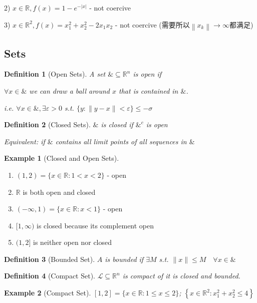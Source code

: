 \documentclass[11pt,a4paper]{article}
\newtheorem{definition}{Definition}
\newtheorem{example}{Example}
\begin{document}
2) $x \in \mathbb{R}, f(x)=1-e^{-|x|}$ - not coercive

3) $x \in \mathbb{R}^{2}, f(x)=x_{1}^{2}+x_{2}^{2}-2 x_{1} x_{2}$ - not coercive
(需要所以$\left\|x_{k}\right\| \rightarrow \infty$都满足)


\subsection{Sets}
\begin{definition}[Open Sets]
    A set $\& \subseteq \mathbb{R}^{n}$ is open if
    
    $\forall x \in \&$ we can draw a ball around $x$ that is contained in $\&$.

    i.e. $\forall x \in \&, \exists \varepsilon>0$ s.t. $\{y:\|y-x\|<\varepsilon\} \leq-\sigma$
\end{definition}

\begin{definition}[Closed Sets]
    $\&$ is closed if $\&^c$ is open

    Equivalent: if $\&$ contains all limit points of all sequences in $\&$
\end{definition}
\begin{example}[Closed and Open Sets]
\end{example}
\begin{enumerate}[1)]
    \item $(1,2)=\{x \in \mathbb{R}: 1<x<2\}$ - open
    \item $\mathbb{R}$ is both open and closed
    \item $(-\infty, 1)=\{x \in \mathbb{R}: x<1\}$ - open
    \item $[1, \infty)$ is closed because its complement open
    \item $(1,2]$ is neither open nor closed
\end{enumerate}

\begin{definition}[Bounded Set]
    $A$ is bounded if $\exists M$ s.t. $\|x\| \leqslant M \quad \forall x \in\&$
\end{definition}

\begin{definition}[Compact Set]
    $\mathcal{L} \subseteq \mathbb{R}^{n}$ is compact of it is closed and bounded.
\end{definition}

\begin{example}[Compact Set]
    $[1,2]=\{x \in \mathbb{R}: 1 \leqslant x \leqslant 2\}$; $\left\{x \in \mathbb{R}^{2}\right.: \left.x_{1}^{2}+x_{2}^{2} \leqslant 4\right\}$
\end{example}
\end{document}
